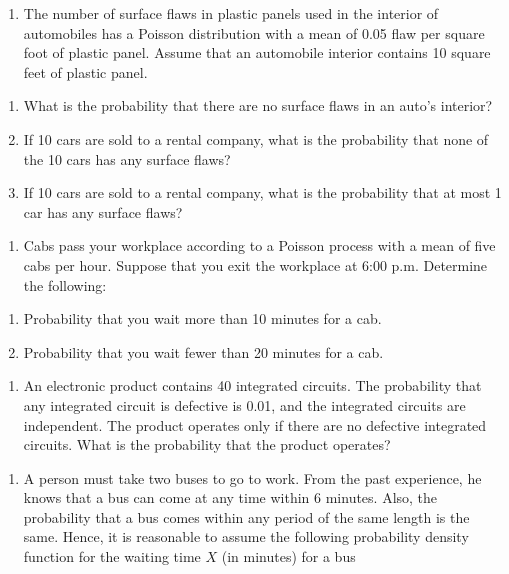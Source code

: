 \documentclass[]{book}
\providecommand{\tightlist}{%
  \setlength{\itemsep}{0pt}\setlength{\parskip}{0pt}}
\begin{document}
\begin{enumerate}
\def\labelenumi{\arabic{enumi}.}
\setcounter{enumi}{18}
\tightlist
\item
  The number of surface flaws in plastic panels used in the interior of automobiles has a Poisson distribution with a mean of 0.05 flaw per square foot of plastic panel. Assume that an automobile interior contains 10 square feet of plastic panel.
\end{enumerate}

\begin{enumerate}
\def\labelenumi{\alph{enumi})}
\item
  What is the probability that there are no surface flaws in an auto's interior?
\item
  If 10 cars are sold to a rental company, what is the probability that none of the 10 cars has any surface flaws?
\item
  If 10 cars are sold to a rental company, what is the probability that at most 1 car has any surface flaws?
\end{enumerate}

\begin{enumerate}
\def\labelenumi{\arabic{enumi}.}
\setcounter{enumi}{19}
\tightlist
\item
  Cabs pass your workplace according to a Poisson process with a mean of five cabs per hour. Suppose that you exit the workplace at 6:00 p.m. Determine the following:
\end{enumerate}

\begin{enumerate}
\def\labelenumi{\alph{enumi})}
\item
  Probability that you wait more than 10 minutes for a cab.
\item
  Probability that you wait fewer than 20 minutes for a cab.
\end{enumerate}

\newpage

\begin{enumerate}
\def\labelenumi{\arabic{enumi}.}
\setcounter{enumi}{10}
\tightlist
\item
  An electronic product contains 40 integrated circuits. The probability that any integrated circuit is defective is 0.01, and the integrated circuits are independent. The product operates only if there are no defective integrated circuits. What is the probability that the product operates?
\end{enumerate}

\begin{enumerate}
\def\labelenumi{\arabic{enumi}.}
\setcounter{enumi}{6}
\tightlist
\item
  A person must take two buses to go to work. From the past experience, he knows that a bus can come at any time within 6 minutes. Also, the probability that a bus comes within any period of the same length is the same. Hence, it is reasonable to assume the following probability density function for the waiting time \(X\) (in minutes) for a bus
\end{enumerate}
\end{document}
